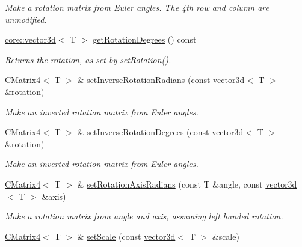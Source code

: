 \begin{DoxyCompactItemize}
\begin{DoxyCompactList}\small\item\em Make a rotation matrix from Euler angles. The 4th row and column are unmodified. \end{DoxyCompactList}\item 
\hyperlink{classirr_1_1core_1_1vector3d}{core\+::vector3d}$<$ T $>$ \hyperlink{classirr_1_1core_1_1CMatrix4_aa348817a724b49816da5c181ba672e1d}{get\+Rotation\+Degrees} () const 
\begin{DoxyCompactList}\small\item\em Returns the rotation, as set by set\+Rotation(). \end{DoxyCompactList}\item 
\hyperlink{classirr_1_1core_1_1CMatrix4}{C\+Matrix4}$<$ T $>$ \& \hyperlink{classirr_1_1core_1_1CMatrix4_a1a15d7b55769678512144f0fb7e15a92}{set\+Inverse\+Rotation\+Radians} (const \hyperlink{classirr_1_1core_1_1vector3d}{vector3d}$<$ T $>$ \&rotation)
\begin{DoxyCompactList}\small\item\em Make an inverted rotation matrix from Euler angles. \end{DoxyCompactList}\item 
\hyperlink{classirr_1_1core_1_1CMatrix4}{C\+Matrix4}$<$ T $>$ \& \hyperlink{classirr_1_1core_1_1CMatrix4_afd84b9c93b4c8e9dc2abefa4a28057f9}{set\+Inverse\+Rotation\+Degrees} (const \hyperlink{classirr_1_1core_1_1vector3d}{vector3d}$<$ T $>$ \&rotation)
\begin{DoxyCompactList}\small\item\em Make an inverted rotation matrix from Euler angles. \end{DoxyCompactList}\item 
\hyperlink{classirr_1_1core_1_1CMatrix4}{C\+Matrix4}$<$ T $>$ \& \hyperlink{classirr_1_1core_1_1CMatrix4_a2fad61540e78fc7dafe7f6270b0558ac}{set\+Rotation\+Axis\+Radians} (const T \&angle, const \hyperlink{classirr_1_1core_1_1vector3d}{vector3d}$<$ T $>$ \&axis)
\begin{DoxyCompactList}\small\item\em Make a rotation matrix from angle and axis, assuming left handed rotation. \end{DoxyCompactList}\item 
\hyperlink{classirr_1_1core_1_1CMatrix4}{C\+Matrix4}$<$ T $>$ \& \hyperlink{classirr_1_1core_1_1CMatrix4_a47117d44419af87e70084c01ab852049}{set\+Scale} (const \hyperlink{classirr_1_1core_1_1vector3d}{vector3d}$<$ T $>$ \&scale)\hypertarget{classirr_1_1core_1_1CMatrix4_a47117d44419af87e70084c01ab852049}{}\label{classirr_1_1core_1_1CMatrix4_a47117d44419af87e70084c01ab852049}


\end{DoxyCompactItemize}
